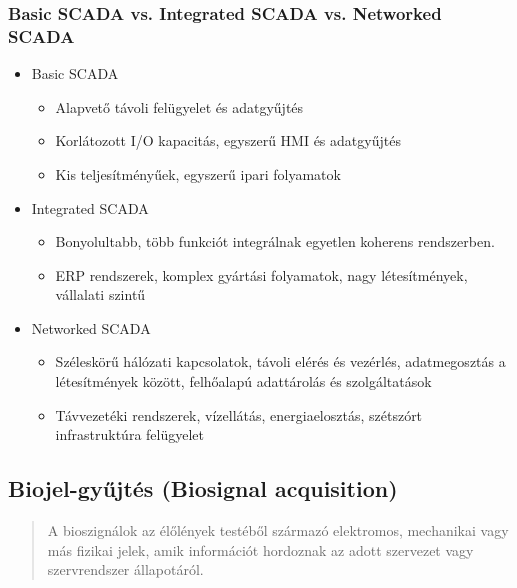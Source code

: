 \subsubsection{Basic SCADA vs. Integrated SCADA vs. Networked SCADA}
\begin{itemize}
    \item Basic SCADA
    \begin{itemize}
        \item Alapvető távoli felügyelet és adatgyűjtés
        \item Korlátozott I/O kapacitás, egyszerű HMI és adatgyűjtés
        \item Kis teljesítményűek, egyszerű ipari folyamatok
    \end{itemize}
    \item Integrated SCADA
    \begin{itemize}
        \item Bonyolultabb, több funkciót integrálnak egyetlen koherens rendszerben.
        \item ERP rendszerek, komplex gyártási folyamatok, nagy létesítmények, vállalati szintű
    \end{itemize}
    \item Networked SCADA
    \begin{itemize}
        \item Széleskörű hálózati kapcsolatok, távoli elérés és vezérlés, adatmegosztás a létesítmények között, felhőalapú adattárolás és szolgáltatások
        \item Távvezetéki rendszerek, vízellátás, energiaelosztás, szétszórt infrastruktúra felügyelet
    \end{itemize}
\end{itemize}

\clearpage
\subsection{Biojel-gyűjtés (Biosignal acquisition)}
\begin{quote}
    A bioszignálok az élőlények testéből származó elektromos, mechanikai vagy más fizikai jelek, amik információt hordoznak az adott szervezet vagy szervrendszer állapotáról.
\end{quote}

